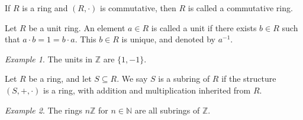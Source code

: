 \documentclass[11pt]{article}
\newcommand{\Z}{\mathbb{Z}}
\newcommand{\N}{\mathbb{N}}
\theoremstyle{definition}
\theoremstyle{remark}
\newtheorem*{example}{Example}
\numberwithin{equation}{section}
\begin{document}
    \begin{definition}
        If $R$ is a ring and $(R, \cdot)$ is commutative, then $R$ is called a
        commutative ring.
    \end{definition}

    \begin{definition}
        Let $R$ be a unit ring. An element $a \in R$ is called a unit if there exists
        $b \in R$ such that $a\cdot b = 1 = b\cdot a$. This $b \in R$ is unique, and
        denoted by $a^{-1}$.
    \end{definition}
    \begin{example}
        The units in $\Z$ are $\{1, -1\}$.
    \end{example}

    \begin{definition}
        Let $R$ be a ring, and let $S \subseteq R$. We say $S$ is a subring of $R$ if
        the structure $(S, +, \cdot)$ is a ring, with addition and multiplication
        inherited from $R$.
    \end{definition}
    \begin{example}
        The rings $n\Z$ for $n \in \N$ are all subrings of $\Z$.
    \end{example}
\end{document}
